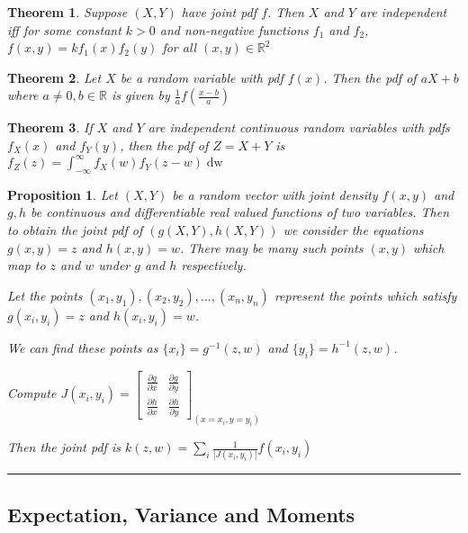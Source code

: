 \documentclass[14pt,twoside]{extreport}
\newcommand{\hhrule}{\vspace{1cm}\hrule\vspace{1cm}}
\theoremstyle{dotless}
\newtheorem*{thm}{Theorem} %
\newtheorem*{prop}{Proposition} %
\begin{document}
\begin{thm}
    Suppose $(X,Y)$ have joint pdf $f$. Then $X$ and $Y$ are independent iff for some constant $k > 0$ and non-negative functions $f_1$ and $f_2$, $f(x,y) = k f_1(x)f_2(y)$ for all $(x,y) \in \mathbb{R}^2$
\end{thm}

\begin{thm}
    Let $X$ be a random variable with pdf $f(x)$. Then the pdf of $aX+b$ where $a \neq 0, b \in \mathbb{R}$ is given by $\displaystyle \frac{1}{a} f \left (\frac{x-b}{a} \right)$
\end{thm}

\begin{thm}
    If $X$ and $Y$ are independent continuous random variables with pdfs $f_X(x)$ and $f_Y(y)$, then the pdf of $Z = X+Y$ is $f_Z\left (z\right ) = \displaystyle\int_{- \infty}^\infty f_X \left (w\right ) f_Y \left (z - w\right ) \mathop{\mathrm{d} w}$
\end{thm}

\begin{prop}
    Let $(X,Y)$ be a random vector with joint density $f(x,y)$ and $g,h$ be continuous and differentiable real valued functions of two variables. Then to obtain the joint pdf of $(g(X,Y), h(X,Y))$ we consider the equations $g(x,y) = z$ and $h(x,y) = w$. There may be many such points $(x,y)$ which map to $z$ and $w$ under $g$ and $h$ respectively.

    Let the points $(x_1, y_1), (x_2, y_2), ..., (x_n, y_n)$ represent the points which satisfy $g(x_i, y_i) = z$ and $h(x_i, y_i) = w$.

    We can find these points as $\{x_i\} = g^{-1}(z,w)$ and $\{ y_i \} = h^{-1}(z,w)$.

    Compute $J(x_i, y_i) = \begin{bmatrix} \frac{\partial g}{\partial x} & \frac{\partial g}{\partial y} \\ \frac{\partial h}{\partial x} & \frac{\partial h}{\partial y} \end{bmatrix}_{(x = x_i, y = y_i)}$

        Then the joint pdf is $k(z,w) = \displaystyle \sum_i \frac{1}{|J(x_i, y_i)|} f(x_i, y_i)$
\end{prop}

\hhrule
\subsection*{Expectation, Variance and Moments}
\end{document}
